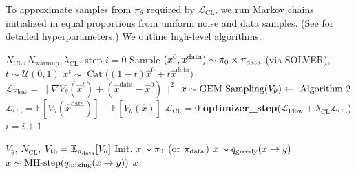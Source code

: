 To approximate samples from \( \pi_\theta \) required by \(\mathcal{L}_{\text{CL}}\), we run Markov chains initialized in equal proportions from uniform noise and data samples.
(See  for detailed hyperparameters.) We outline high-level algorithms:
\begin{algorithm}[H]
\caption{GEM Training}
\small
\begin{algorithmic}[1]
 $N_{\text{CL}}, N_{\text{warmup}}, \lambda_{\text{CL}}$, step $i=0$
    \STATE Sample $(x^{0},x^{\text{data}})\sim\pi_{0}\times\pi_{\text{data}}$ (via SOLVER), $t\sim\mathcal{U}(0,1)$
    \STATE $x^t\sim \operatorname{Cat}\big((1 - t)\hat{x}^0 + t\hat{x}^{\text{data}}\big)$
    \STATE $\mathcal{L}_{\text{Flow}}=\|\nabla\tilde{V}_\theta(\hat{x}^t)+(\hat{x}^{\text{data}}-\hat{x}^0)\|^2$
        \STATE $x \sim \text{GEM Sampling}(V_\theta) \hfill \leftarrow\ \text{Algorithm~2}$
        \STATE $\mathcal{L}_{\text{CL}}=\mathbb{E}[\tilde{V_\theta}(\hat{x}^{\text{data}})]-\mathbb{E}[\tilde{V_\theta}(\hat{x})]$
    \ELSE
        \STATE $\mathcal{L}_{\text{CL}}=0$
    \ENDIF
    \STATE \textbf{optimizer\_step}($\mathcal{L}_{\text{Flow}}+\lambda_{\text{CL}}\mathcal{L}_{\text{CL}}$) 
    \STATE $i=i+1$
\ENDWHILE
\end{algorithmic}
\end{algorithm}

\begin{algorithm}[H]
\caption{GEM Sampling}
\small
\begin{algorithmic}[1]
 $V_\theta$, $N_{\text{CL}}$, $V_\text{th}=\mathbb{E}_{\pi_{\text{data}}}[V_\theta]$
\STATE Init. $x\sim\pi_{0}$ (or $\pi_{\text{data}}$)
    \STATE $x\sim q_{\text{greedy}}(x\to y)$
\ENDWHILE
{}
    \STATE $x\sim \text{MH-step}(q_{\text{mixing}}(x\to y))$
\ENDFOR
{} $x$
\end{algorithmic}
\end{algorithm}
\vspace{-1em}